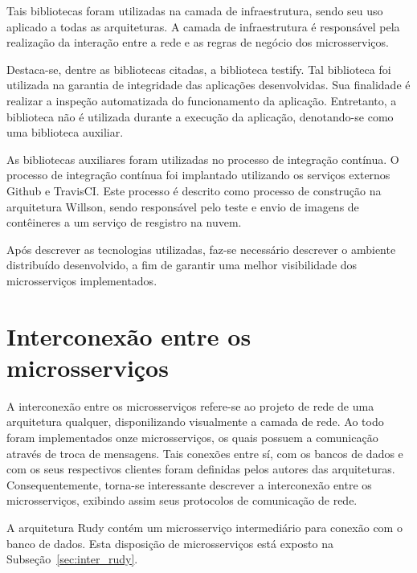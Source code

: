 Tais bibliotecas foram utilizadas na camada de infraestrutura, sendo seu uso aplicado a todas as arquiteturas.
%
A camada de infraestrutura é responsável pela realização da interação entre a rede e as regras de negócio dos microsserviços.


Destaca-se, dentre as bibliotecas citadas, a biblioteca testify.
%
Tal biblioteca foi utilizada na garantia de integridade das aplicações desenvolvidas.
%
Sua finalidade é realizar a inspeção automatizada do funcionamento da aplicação.
%
Entretanto, a biblioteca não é utilizada durante a execução da aplicação, denotando-se como uma biblioteca auxiliar.



As bibliotecas auxiliares foram utilizadas no processo de integração contínua.
%
O processo de integração contínua foi implantado utilizando os serviços externos Github e TravisCI.
%
Este processo é descrito como processo de construção na arquitetura Willson, sendo responsável pelo teste e envio de imagens de contêineres a um serviço de resgistro na nuvem.




Após descrever as tecnologias utilizadas, faz-se necessário descrever o ambiente distribuído desenvolvido, a fim de garantir uma melhor visibilidade dos microsserviços implementados.



\section{Interconexão entre os microsserviços}
\label{sec:interconexao}



A interconexão entre os microsserviços refere-se ao projeto de rede de uma arquitetura qualquer, disponilizando visualmente a camada de rede.
%
Ao todo foram implementados onze microsserviços, os quais possuem a comunicação através de troca de mensagens.
%
Tais conexões entre sí, com os bancos de dados e com os seus respectivos clientes foram definidas pelos autores das arquiteturas.
%
Consequentemente, torna-se interessante descrever a interconexão entre os microsserviços, exibindo assim seus protocolos de comunicação de rede.



A arquitetura Rudy contém um microsserviço intermediário para conexão com o banco de dados.
%
Esta disposição de microsserviços está exposto na Subseção~\ref{sec:inter_rudy}.



